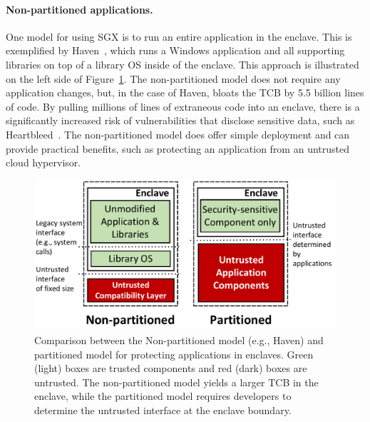 \paragraph{Non-partitioned applications.}
One model for using SGX is to run an entire application in the enclave.
This is exemplified by Haven~\citep{baumann14haven}, which runs a Windows application and all supporting libraries
on top of a library OS inside of the enclave.  This approach is illustrated on the left side of Figure~\ref{fig:libosvssdk}.
The non-partitioned model does not require any application changes, but, in the case of Haven, bloats the TCB by 5.5 billion lines of code.
By pulling millions of lines of extraneous code into an enclave, there is a significantly increased risk 
of vulnerabilities that disclose
sensitive data, such as Heartbleed~\citep{heartbleed}.
The non-partitioned model does offer simple deployment and can provide practical benefits, 
such as protecting an application from an untrusted cloud hypervisor.

\begin{figure}[t!]
\centering
\includegraphics[width=\linewidth]{civet/figures/libosvssdk.pdf}
\footnotesize
\vspace{-0.2in}
\caption[Comparison between the Non-partitioned model and the partitioned model.]
{Comparison between the Non-partitioned model (e.g., Haven)
and partitioned model for protecting applications in enclaves.
Green (light) boxes are trusted components and red (dark) boxes are untrusted.
The non-partitioned model yields a larger TCB in the enclave,
while the partitioned model requires developers to determine the untrusted interface at the enclave boundary.}
\label{fig:libosvssdk}
\end{figure}

